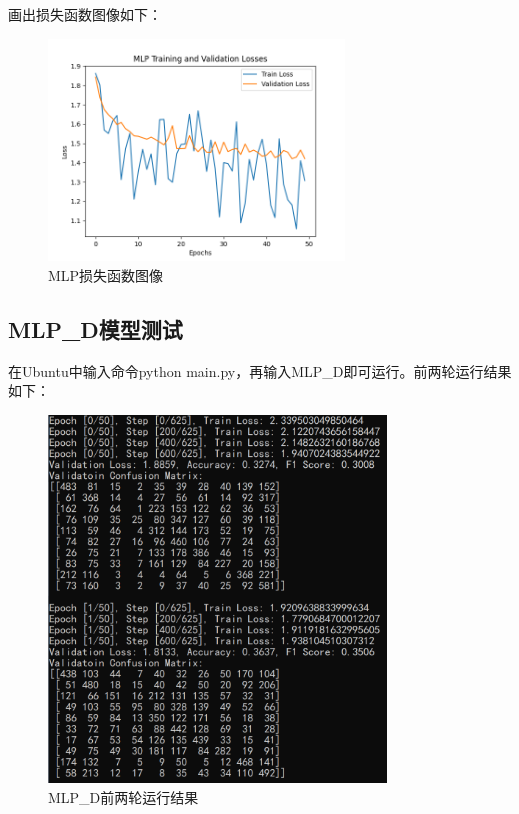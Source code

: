 \documentclass[UTF8]{ctexart}
\begin{document}
画出损失函数图像如下：
\begin{figure}[h]
    \centering
    \includegraphics[width=0.7\textwidth]{MLP_loss_curve.png}
    \caption*{MLP损失函数图像}
\end{figure}

\newpage

\subsection{MLP\_D模型测试}
在Ubuntu中输入命令python main.py，再输入MLP\_D即可运行。前两轮运行结果如下：
\begin{figure}[h]
    \centering
    \includegraphics[width=0.8\textwidth]{MLP_D_run.png}
    \caption*{MLP\_D前两轮运行结果}
\end{figure}
\end{document}
